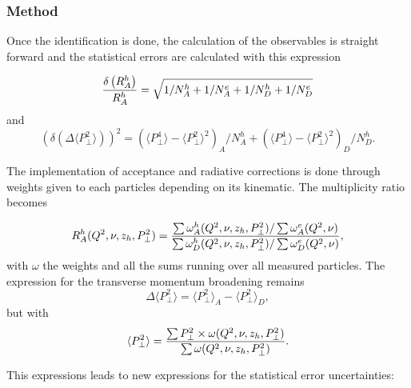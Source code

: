 \subsubsection{Method}
\label{RatioCalc}

Once the identification is done, the calculation of the observables is 
straight forward and the statistical errors are calculated with this expression

\begin{equation}
{\delta \left ( R_A^h \right ) \over R_A^h} = \sqrt{ 1 /N_A^h + 1/ N_A^e +1/N_D^h + 1/N_D^e}
\end{equation}
and
\begin{equation}
\left ( \delta \left ( \Delta \langle P_\perp^2 \rangle \right ) \right )^2 = 
   \left ({\langle P_\perp^4 \rangle - \langle P_\perp^2 \rangle ^2}\right )_A / N_A^h
 + \left ({\langle P_\perp^4 \rangle - \langle P_\perp^2 \rangle ^2}\right )_D / N_D^h.
\end{equation}

The implementation of acceptance and radiative corrections is done through weights
given to each particles depending on its kinematic. The multiplicity ratio becomes

\begin{equation}
R_A^h (Q^2,\nu,z_h,P_\perp^2) = {{\sum \omega_A^h (Q^2,\nu,z_h,P_\perp^2) / \sum \omega_A^e (Q^2,\nu)} 
                       \over {\sum \omega_D^h (Q^2,\nu,z_h,P_\perp^2) / \sum \omega_D^e (Q^2,\nu)}},
\end{equation}
with $\omega$ the weights and all the sums running over all measured particles.
The expression for the transverse momentum broadening remains
\begin{equation}
\Delta \langle P_\perp^2 \rangle = \langle P_\perp^2 \rangle_A - \langle P_\perp^2 \rangle_D,
\end{equation}
but with
\begin{equation}
\langle P_\perp^2 \rangle = {\sum P_\perp^2 \times \omega (Q^2,\nu,z_h,P_\perp^2) \over \sum \omega (Q^2,\nu,z_h,P_\perp^2)}.
\end{equation}

This expressions leads to new expressions for the statistical error uncertainties: 

